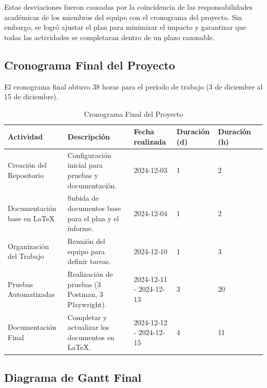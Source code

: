 \documentclass[stu, 12pt, letterpaper, donotrepeattitle, floatsintext, natbib]{apa7}
\begin{document}
Estas desviaciones fueron causadas por la coincidencia de las responsabilidades académicas de los miembros del equipo con el cronograma del proyecto. Sin embargo, se logró ajustar el plan para minimizar el impacto y garantizar que todas las actividades se completaran dentro de un plazo razonable.

\subsection*{Cronograma Final del Proyecto}
El cronograma final obtuvo 38 horas para el periodo de trabajo (3 de diciembre al 15 de diciembre).

\begin{table}[H]
    \centering
    \caption{Cronograma Final del Proyecto}
    \label{fig:cronograma}
    \begin{tabular}{|p{3cm}|p{4cm}|p{2cm}|p{2cm}|p{1.5cm}|p{1.5cm}|}
        \hline
        \textbf{Actividad} & \textbf{Descripción} & \textbf{Fecha realizada} & \textbf{Duración (d)} & \textbf{Duración (h)} \\ \hline
        Creación del Repositorio & Configuración inicial para pruebas y documentación. & 2024-12-03 & 1 & 2 \\ \hline
        Documentación base en LaTeX & Subida de documentos base para el plan y el informe. & 2024-12-04 & 1 & 2 \\ \hline
        Organización del Trabajo & Reunión del equipo para definir tareas. & 2024-12-10 & 1 & 3 \\ \hline
        Pruebas Automatizadas & Realización de pruebas (3 Postman, 3 Playwright). & 2024-12-11 - 2024-12-13 & 3 & 20 \\ \hline
        Documentación Final & Completar y actualizar los documentos en LaTeX. & 2024-12-12 - 2024-12-15 & 4 & 11 \\ \hline
    \end{tabular}
\end{table}

\subsection*{Diagrama de Gantt Final}
\end{document}
